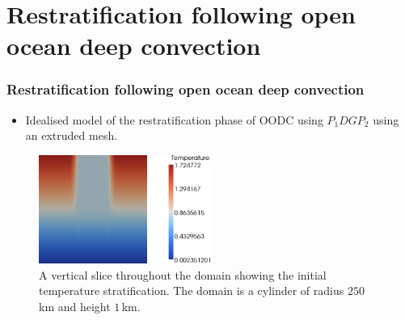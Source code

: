 \section{Restratification following open ocean deep convection}

\begin{frame}
    \frametitle{Restratification following open ocean deep convection}
\begin{itemize}
\item Idealised model of the restratification phase of OODC using $P_1DGP_2$ using an extruded mesh.
\end{itemize}
\begin{figure}
\includegraphics[width=0.5\textwidth]{./restratification_after_oodc/rousset-init.png}
\caption{A vertical slice throughout the domain showing the initial temperature stratification. The domain is a cylinder of radius $250 \,$km and height $1\,$km.}
\end{figure}
\end{frame}
%
